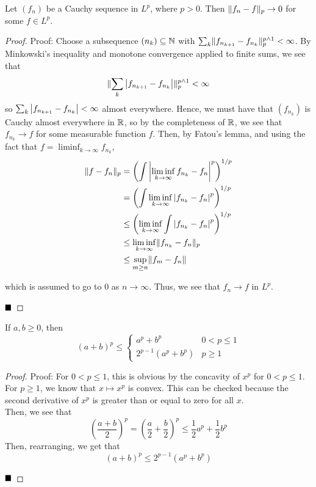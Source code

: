 \begin{lemma}
    Let $(f_n)$ be a Cauchy sequence in $L^{p}$, where $p > 0$. Then $\lVert {f_n - f} \rVert_{p} \to 0$ for some $f \in L^{p}$. 
\end{lemma}
\begin{proof}{Proof:}
    Choose a subsequence $(n_k) \subseteq \mathbb{N}$ with $\sum_{k} \lVert {f_{n_{k + 1}} - f_{n_{k}}} \rVert_{p}^{p \wedge 1} < \infty$. By Minkowski's inequality and monotone convergence applied to finite sums, we see that
    \[ \lVert {\sum_{k} \left\lvert {f_{n_{k + 1}} - f_{n_{k}}} \right\rvert} \rVert_{p}^{p \wedge 1} < \infty \]
    so $\sum_{k} \left\lvert {f_{n_{k + 1}} - f_{n_{k}}} \right\rvert < \infty$ almost everywhere. Hence, we must have that $(f_{n_{k}})$ is Cauchy almost everywhere in $\mathbb{R}$, so by the completeness of $\mathbb{R}$, we see that $f_{n_{k}} \to f$ for some measurable function $f$. Then, by Fatou's lemma, and using the fact that $f = \liminf_{k \to \infty} f_{n_k}$,
    \begin{align*}
        \lVert {f - f_n} \rVert_{p} &= \left(\int \left\lvert {\liminf_{k \to \infty} f_{n_{k}} - f_{n}} \right\rvert^{p}\right)^{1/p}\\
        &= \left(\int \liminf_{k \to \infty}  \left\lvert {f_{n_{k}} - f_{n}} \right\rvert^{p}\right)^{1/p}\\
        &\leq \left(\liminf_{k \to \infty} \int \left\lvert {f_{n_k} - f_n} \right\rvert^{p}\right)^{1/p}\\
        &\leq \liminf_{k \to \infty}\lVert {f_{n_k} - f_n} \rVert_{p}\\
        &\leq \sup_{m \geq n} \lVert {f_m - f_n} \rVert
    \end{align*}

    which is assumed to go to $0$ as $n \to \infty$. Thus, we see that $f_n \to f$ in $L^{p}$. 

    $\qed$
\end{proof}

\begin{lemma}
    If $a, b \geq 0$, then
    \[ (a + b)^{p} \leq \left\{\begin{matrix} a^{p} + b^{p} & 0 < p \leq 1 \\ 2^{p - 1}(a^{p} + b^{p}) & p \geq 1 \end{matrix}\right. \]
\end{lemma}
\begin{proof}{Proof:}
    For $0 < p \leq 1$, this is obvious by the concavity of $x^{p}$ for $0 < p \leq 1$. For $p \geq 1$, we know that $x \mapsto x^{p}$ is convex. This can be checked because the second derivative of $x^{p}$ is greater than or equal to zero for all $x$.\\

    Then, we see that
    \[ \left(\frac{a + b}{2}\right)^{p} = \left(\frac{a}{2} + \frac{b}{2}\right)^{p} \leq \frac{1}{2}a^{p} + \frac{1}{2}b^{p} \]
    Then, rearranging, we get that
    \[ (a + b)^{p} \leq 2^{p - 1}\left(a^{p} + b^{p}\right) \]

    $\qed$
\end{proof}

